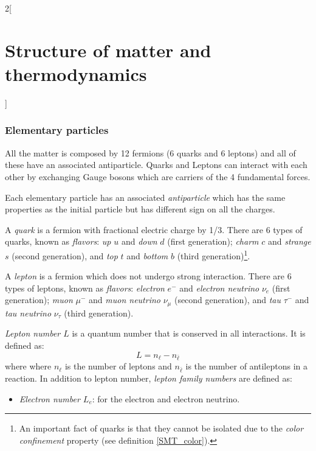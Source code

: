 \documentclass[../../../main.tex]{subfiles}
\begin{document}
\begin{multicols}{2}[\section{Structure of matter and thermodynamics}]
    \subsubsection{Elementary particles}
    \begin{definition}
        All the matter is composed by 12 fermions (6 quarks and 6 leptons) and all of these have an associated antiparticle. Quarks and Leptons can interact with each other by exchanging Gauge bosons which are carriers of the 4 fundamental forces.
    \end{definition}
    \begin{definition}[Antimatter]
        Each elementary particle has an associated \textit{antiparticle} which has the same properties as the initial particle but has different sign on all the charges.
    \end{definition}
    \begin{definition}[Quark]
        A \textit{quark} is a fermion with fractional electric charge by 1/3. There are 6 types of quarks, known as \textit{flavors}: \textit{up} $u$ and \textit{down} $d$ (first generation); \textit{charm} $c$ and \textit{strange} $s$ (second generation), and \textit{top} $t$ and \textit{bottom} $b$ (third generation)\footnote{An important fact of quarks is that they cannot be isolated due to the \textit{color confinement} property (see definition \cref{SMT_color}).}.
    \end{definition}
    \begin{definition}[Lepton]
        A \textit{lepton} is a fermion which does not undergo strong interaction. There are 6 types of leptons, known as \textit{flavors}: \textit{electron} $e^-$ and \textit{electron neutrino} $\nu_e$ (first generation); \textit{muon} $\mu^-$ and \textit{muon neutrino} $\nu_\mu$ (second generation), and \textit{tau} $\tau^-$ and \textit{tau neutrino} $\nu_\tau$ (third generation).
    \end{definition}
    \begin{definition}
        \textit{Lepton number $L$} is a quantum number that is conserved in all interactions. It is defined as: $$L=n_\ell-n_{\bar{\ell}}$$ where where  $n_\ell$ is the number of leptons and $n_{\bar{\ell}}$ is the number of antileptons in a reaction. In addition to lepton number, \textit{lepton family numbers} are defined as:
        \begin{itemize}
            \item \textit{Electron number $L_e$}: for the electron and electron neutrino.

\end{itemize}
\end{definition}
\end{multicols}
\end{document}

